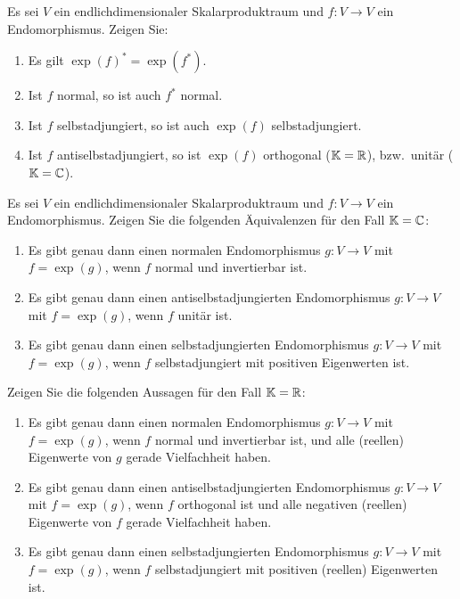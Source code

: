 \documentclass[a4paper,10pt]{scrartcl}
\begin{document}
\begin{question}
  Es sei $V$ ein endlichdimensionaler Skalarproduktraum und $f \colon V \to V$ ein Endomorphismus.
  Zeigen Sie:
  \begin{enumerate}[leftmargin=*]
    \item
      Es gilt $\exp(f)^* = \exp(f^*)$.
    \item
      Ist $f$ normal, so ist auch $f^*$ normal.
    \item
      Ist $f$ selbstadjungiert, so ist auch $\exp(f)$ selbstadjungiert.
    \item
      Ist $f$ antiselbstadjungiert, so ist $\exp(f)$ orthogonal ($\mathbb{K} = \mathbb{R}$), bzw.\ unitär ($\mathbb{K} = \mathbb{C}$).
  \end{enumerate}
\end{question}


\begin{question}
  Es sei $V$ ein endlichdimensionaler Skalarproduktraum und $f \colon V \to V$ ein Endomorphismus.
  \newline
  Zeigen Sie die folgenden Äquivalenzen für den Fall $\mathbb{K} = \mathbb{C}$:
  \begin{enumerate}[leftmargin=*]
    \item
      Es gibt genau dann einen normalen Endomorphismus $g \colon V \to V$ mit $f = \exp(g)$, wenn $f$ normal und invertierbar ist.
    \item
      Es gibt genau dann einen antiselbstadjungierten Endomorphismus $g \colon V \to V$ mit $f = \exp(g)$, wenn $f$ unitär ist.
    \item
      Es gibt genau dann einen selbstadjungierten Endomorphismus $g \colon V \to V$ mit $f = \exp(g)$, wenn $f$ selbstadjungiert mit positiven Eigenwerten ist.
  \end{enumerate}
  Zeigen Sie die folgenden Aussagen für den Fall $\mathbb{K} = \mathbb{R}$:
  \begin{enumerate}[leftmargin=*, resume]
    \item
      Es gibt genau dann einen normalen Endomorphismus $g \colon V \to V$ mit $f = \exp(g)$, wenn $f$ normal und invertierbar ist, und alle (reellen) Eigenwerte von $g$ gerade Vielfachheit haben.
    \item
      Es gibt genau dann einen antiselbstadjungierten Endomorphismus $g \colon V \to V$ mit $f = \exp(g)$, wenn $f$ orthogonal ist und alle negativen (reellen) Eigenwerte von $f$ gerade Vielfachheit haben.
    \item
      Es gibt genau dann einen selbstadjungierten Endomorphismus $g \colon V \to V$ mit $f = \exp(g)$, wenn $f$ selbstadjungiert mit positiven (reellen) Eigenwerten ist.
  \end{enumerate}
\end{question}
\end{document}
